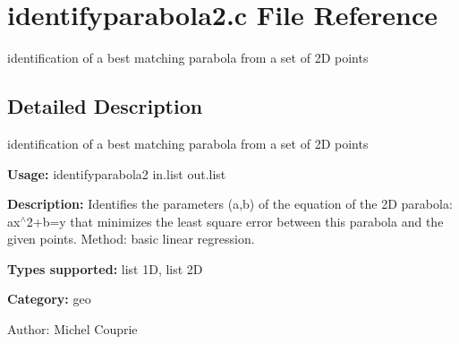 \section{identifyparabola2.c File Reference}
\label{identifyparabola2_8c}
identification of a best matching parabola from a set of 2D points  




\label{_details}
\subsection{Detailed Description}
identification of a best matching parabola from a set of 2D points 

{\bf Usage:} identifyparabola2 in.list out.list

{\bf Description:} Identifies the parameters (a,b) of the equation of the 2D parabola: ax$^\wedge$2+b=y that minimizes the least square error between this parabola and the given points. Method: basic linear regression.

{\bf Types supported:} list 1D, list 2D

{\bf Category:} geo

\begin{Desc}
\item[Author:]Michel Couprie \end{Desc}
